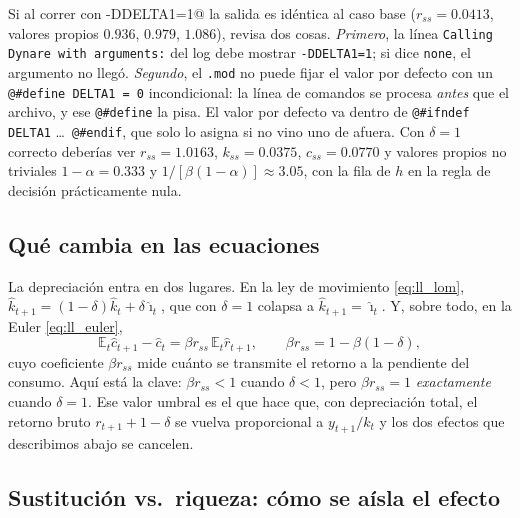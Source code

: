 \documentclass[11pt,a4paper]{report}
\newenvironment{errorbox}[1][]{%
  \begin{tcolorbox}[errorstyle, title={\erroricon~~Error común%
    \ifx\relax#1\relax\else: #1\fi}]}%
{\end{tcolorbox}}
\newcommand{\code}[1]{\texttt{#1}}
\newcommand{\E}{\mathbb{E}}
\newcommand{\erroricon}{\raisebox{-0.5pt}{\begin{tikzpicture}[scale=0.11,baseline=-0.5ex]
  \draw[line width=2.4pt, line join=round] (0,1.9) -- (-1.1,-0.05) -- (1.1,-0.05) -- cycle;
  \draw[line width=2.2pt, line cap=round] (0,1.28) -- (0,0.58);
  \fill (0,0.28) circle (1.7pt);
\end{tikzpicture}}}
\begin{document}
\begin{errorbox}[el interruptor que no cambia nada]
Si al correr con \lstinline@-DDELTA1=1@ la salida es idéntica al caso base
($r_{ss}=0.0413$, valores propios $0.936$, $0.979$, $1.086$), revisa dos cosas.
\emph{Primero}, la línea \texttt{Calling Dynare with arguments:} del log debe mostrar
\texttt{-DDELTA1=1}; si dice \texttt{none}, el argumento no llegó. \emph{Segundo}, el
\code{.mod} no puede fijar el valor por defecto con un \lstinline|@#define DELTA1 = 0|
incondicional: la línea de comandos se procesa \emph{antes} que el archivo, y ese
\lstinline|@#define| la pisa. El valor por defecto va dentro de
\lstinline|@#ifndef DELTA1| \ldots\ \lstinline|@#endif|, que solo lo asigna si no vino
uno de afuera. Con $\delta=1$ correcto deberías ver $r_{ss}=1.0163$, $k_{ss}=0.0375$,
$c_{ss}=0.0770$ y valores propios no triviales $1-\alpha=0.333$ y $1/[\beta(1-\alpha)]
\approx3.05$, con la fila de $h$ en la regla de decisión prácticamente nula.
\end{errorbox}

\subsection{Qué cambia en las ecuaciones}

La depreciación entra en dos lugares. En la ley de movimiento \eqref{eq:ll_lom},
$\hat{k}_{t+1}=(1-\delta)\hat{k}_t+\delta\hat{\imath}_t$, que con $\delta=1$
colapsa a $\hat{k}_{t+1}=\hat{\imath}_t$. Y, sobre todo, en la Euler
\eqref{eq:ll_euler},
\[
  \E_t\hat{c}_{t+1}-\hat{c}_t=\beta r_{ss}\,\E_t\hat{r}_{t+1},
  \qquad \beta r_{ss}=1-\beta(1-\delta),
\]
cuyo coeficiente $\beta r_{ss}$ mide cuánto se transmite el retorno a la pendiente
del consumo. Aquí está la clave: $\beta r_{ss}<1$ cuando $\delta<1$, pero
$\beta r_{ss}=1$ \emph{exactamente} cuando $\delta=1$. Ese valor umbral es el que
hace que, con depreciación total, el retorno bruto $r_{t+1}+1-\delta$ se vuelva
proporcional a $y_{t+1}/k_t$ y los dos efectos que describimos abajo se cancelen.

\subsection{Sustitución vs.\ riqueza: cómo se aísla el efecto}
\end{document}
